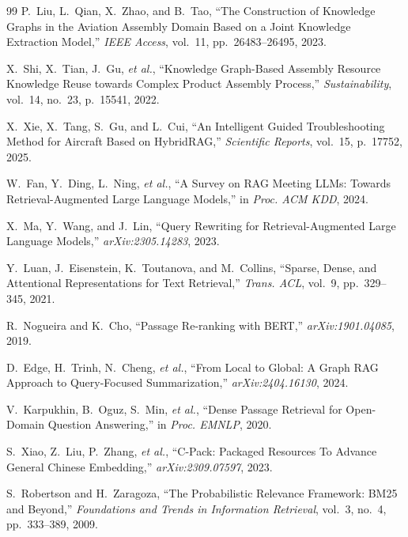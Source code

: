 \documentclass[12pt, a4paper]{article}
\begin{document}
\begin{thebibliography}{99}
P.~Liu, L.~Qian, X.~Zhao, and B.~Tao,
``The Construction of Knowledge Graphs in the Aviation Assembly Domain Based on a Joint Knowledge Extraction Model,''
\textit{IEEE Access}, vol.~11, pp.~26483--26495, 2023.

X.~Shi, X.~Tian, J.~Gu, \textit{et al.},
``Knowledge Graph-Based Assembly Resource Knowledge Reuse towards Complex Product Assembly Process,''
\textit{Sustainability}, vol.~14, no.~23, p.~15541, 2022.

X.~Xie, X.~Tang, S.~Gu, and L.~Cui,
``An Intelligent Guided Troubleshooting Method for Aircraft Based on HybridRAG,''
\textit{Scientific Reports}, vol.~15, p.~17752, 2025.

W.~Fan, Y.~Ding, L.~Ning, \textit{et al.},
``A Survey on RAG Meeting LLMs: Towards Retrieval-Augmented Large Language Models,''
in \textit{Proc. ACM KDD}, 2024.

X.~Ma, Y.~Wang, and J.~Lin,
``Query Rewriting for Retrieval-Augmented Large Language Models,''
\textit{arXiv:2305.14283}, 2023.

Y.~Luan, J.~Eisenstein, K.~Toutanova, and M.~Collins,
``Sparse, Dense, and Attentional Representations for Text Retrieval,''
\textit{Trans. ACL}, vol.~9, pp.~329--345, 2021.

R.~Nogueira and K.~Cho,
``Passage Re-ranking with BERT,''
\textit{arXiv:1901.04085}, 2019.

D.~Edge, H.~Trinh, N.~Cheng, \textit{et al.},
``From Local to Global: A Graph RAG Approach to Query-Focused Summarization,''
\textit{arXiv:2404.16130}, 2024.

V.~Karpukhin, B.~Oguz, S.~Min, \textit{et al.},
``Dense Passage Retrieval for Open-Domain Question Answering,''
in \textit{Proc. EMNLP}, 2020.

S.~Xiao, Z.~Liu, P.~Zhang, \textit{et al.},
``C-Pack: Packaged Resources To Advance General Chinese Embedding,''
\textit{arXiv:2309.07597}, 2023.

S.~Robertson and H.~Zaragoza,
``The Probabilistic Relevance Framework: BM25 and Beyond,''
\textit{Foundations and Trends in Information Retrieval}, vol.~3, no.~4, pp.~333--389, 2009.


\end{thebibliography}
\end{document}
